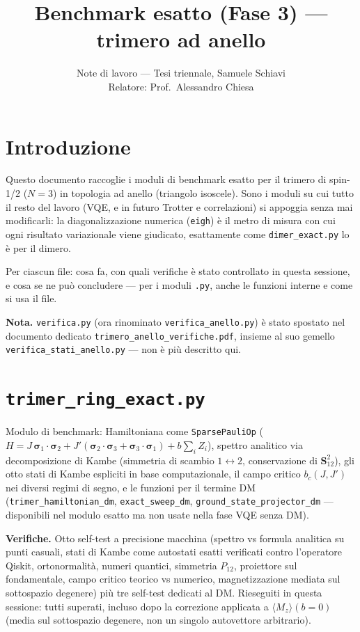\documentclass[11pt,a4paper]{article}
\title{Benchmark esatto (Fase 3) — trimero ad anello}
\author{Note di lavoro — Tesi triennale, Samuele Schiavi\\ Relatore: Prof.\ Alessandro Chiesa}
\date{}
\begin{document}
\maketitle

\section*{Introduzione}

Questo documento raccoglie i moduli di benchmark esatto per il trimero di spin-1/2
($N=3$) in topologia ad anello (triangolo isoscele). Sono i moduli su cui tutto il
resto del lavoro (VQE, e in futuro Trotter e correlazioni) si appoggia senza mai
modificarli: la diagonalizzazione numerica (\texttt{eigh}) è il metro di misura con
cui ogni risultato variazionale viene giudicato, esattamente come
\texttt{dimer\_exact.py} lo è per il dimero.

Per ciascun file: cosa fa, con quali verifiche è stato controllato in questa sessione,
e cosa se ne può concludere — per i moduli \texttt{.py}, anche le funzioni interne e
come si usa il file.

\textbf{Nota.} \texttt{verifica.py} (ora rinominato \texttt{verifica\_anello.py}) è
stato spostato nel documento dedicato \texttt{trimero\_anello\_verifiche.pdf}, insieme
al suo gemello \texttt{verifica\_stati\_anello.py} — non è più descritto qui.

\section*{\texttt{trimer\_ring\_exact.py}}

Modulo di benchmark: Hamiltoniana come \texttt{SparsePauliOp}
($H=J\,\boldsymbol\sigma_1\cdot\boldsymbol\sigma_2+J'(\boldsymbol\sigma_2\cdot\boldsymbol\sigma_3+\boldsymbol\sigma_3\cdot\boldsymbol\sigma_1)+b\sum_iZ_i$),
spettro analitico via decomposizione di Kambe (simmetria di scambio
$1\leftrightarrow2$, conservazione di $\mathbf S_{12}^2$), gli otto stati di Kambe
espliciti in base computazionale, il campo critico $b_c(J,J')$ nei diversi regimi di
segno, e le funzioni per il termine DM (\texttt{trimer\_hamiltonian\_dm},
\texttt{exact\_sweep\_dm}, \texttt{ground\_state\_projector\_dm} — disponibili nel
modulo esatto ma non usate nella fase VQE senza DM).

\textbf{Verifiche.} Otto self-test a precisione macchina (spettro vs formula analitica
su punti casuali, stati di Kambe come autostati esatti verificati contro l'operatore
Qiskit, ortonormalità, numeri quantici, simmetria $P_{12}$, proiettore sul
fondamentale, campo critico teorico vs numerico, magnetizzazione mediata sul
sottospazio degenere) più tre self-test dedicati al DM. Rieseguiti in questa sessione:
tutti superati, incluso dopo la correzione applicata a $\langle M_z\rangle(b{=}0)$
(media sul sottospazio degenere, non un singolo autovettore arbitrario).
\end{document}
